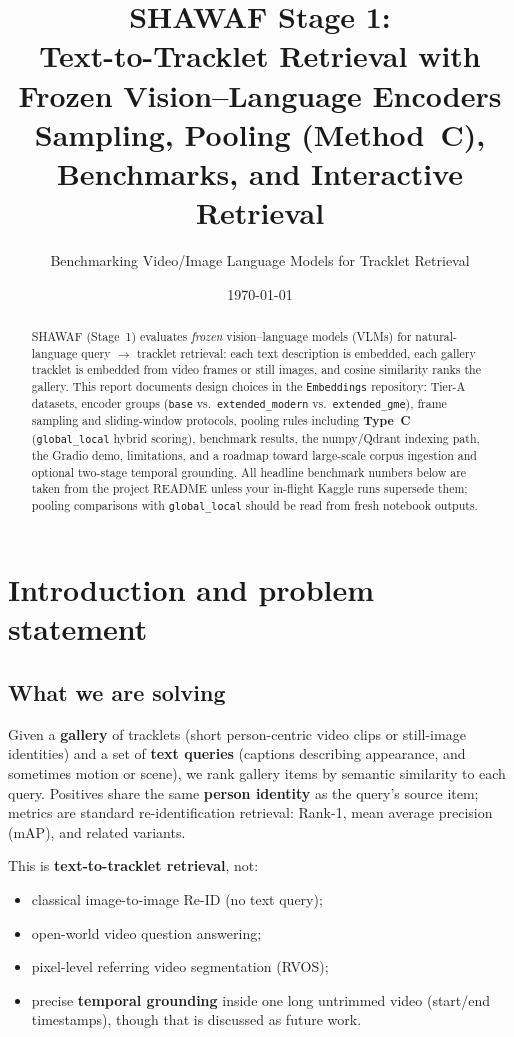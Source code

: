 \documentclass[11pt,a4paper]{article}
\title{SHAWAF Stage 1:\\Text-to-Tracklet Retrieval with Frozen Vision--Language Encoders\\[0.4em]
\large Sampling, Pooling (Method~C), Benchmarks, and Interactive Retrieval}
\author{Benchmarking Video/Image Language Models for Tracklet Retrieval}
\date{\today}
\begin{document}
\maketitle

\begin{abstract}
SHAWAF (Stage~1) evaluates \emph{frozen} vision--language models (VLMs) for natural-language query $\rightarrow$ tracklet retrieval: each text description is embedded, each gallery tracklet is embedded from video frames or still images, and cosine similarity ranks the gallery.
This report documents design choices in the \texttt{Embeddings} repository: Tier-A datasets, encoder groups (\texttt{base} vs.\ \texttt{extended\_modern} vs.\ \texttt{extended\_gme}), frame sampling and sliding-window protocols, pooling rules including \textbf{Type~C} (\texttt{global\_local} hybrid scoring), benchmark results, the numpy/Qdrant indexing path, the Gradio demo, limitations, and a roadmap toward large-scale corpus ingestion and optional two-stage temporal grounding.
All headline benchmark numbers below are taken from the project README unless your in-flight Kaggle runs supersede them; pooling comparisons with \texttt{global\_local} should be read from fresh notebook outputs.
\end{abstract}

\tableofcontents
\newpage

\section{Introduction and problem statement}

\subsection{What we are solving}
Given a \textbf{gallery} of tracklets (short person-centric video clips or still-image identities) and a set of \textbf{text queries} (captions describing appearance, and sometimes motion or scene), we rank gallery items by semantic similarity to each query.
Positives share the same \textbf{person identity} as the query's source item; metrics are standard re-identification retrieval: Rank-1, mean average precision (mAP), and related variants.

This is \textbf{text-to-tracklet retrieval}, not:
\begin{itemize}[noitemsep]
  \item classical image-to-image Re-ID (no text query);
  \item open-world video question answering;
  \item pixel-level referring video segmentation (RVOS);
  \item precise \textbf{temporal grounding} inside one long untrimmed video (start/end timestamps), though that is discussed as future work.
\end{itemize}
\end{document}
